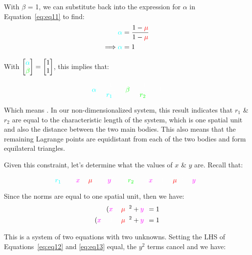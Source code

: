 With $\beta$ = 1, we can substitute back into the expression for $\alpha$ in Equation~\eqref{eq:eq11} to find:
\begin{align*}
    \cc \alpha \cw                 & = \ddfrac{1-\cred\mu}{1-\cred\mu}
    \\
    \Longrightarrow \cc \alpha \cw & = 1
\end{align*}

With $
    \begin{bmatrix}
        \cc \alpha \\
        \cg \beta
    \end{bmatrix}
    =
    \begin{bmatrix}
        1 \\
        1
    \end{bmatrix}
$, this implies that:

\begin{equation*}
    \cc \alpha \cw = \ddfrac{1}{\cc r_1 \cw ^3} = \cg \beta \cw = \ddfrac{1}{\cg r_2 \cw ^3} = 1
\end{equation*}

Which means . In our non-dimensionalized system, this result indicates that $r_1$ \& $r_2$ are equal to the characteristic length of the system, which is one spatial unit and also the distance between the two main bodies. This also means that the remaining Lagrange points are equidistant from each of the two bodies and form equilateral triangles.

\vspace{\baselineskip}

Given this constraint, let's determine what the values of $x$ \& $y$ are. Recall that:

\begin{equation*}
    \cc r_1 \cw ^2 = \left(\cm x \cw + \cred \mu \cw\right)^2 + \cm y \cw ^2
    \qquad \cg r_2 \cw ^2 = \left(\cm x \cw - 1 + \cred \mu \cw\right)^2 + \cm y \cw ^2
\end{equation*}

Since the norms are equal to one spatial unit, then we have:
\begin{align}
    \left(\cm x \cw + \cred \mu \cw\right)^2 + \cm y \cw ^2     & = 1 \label{eq:eq12}
    \\
    \left(\cm x \cw - 1 + \cred \mu \cw\right)^2 + \cm y \cw ^2 & = 1 \label{eq:eq13}
\end{align}

This is a system of two equations with two unknowns. Setting the LHS of Equations~\eqref{eq:eq12} and \eqref{eq:eq13} equal, the $y^2$ terms cancel and we have:

